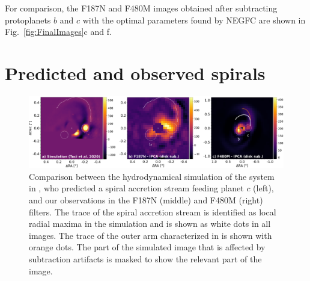 \documentclass[longauth]{aa}
\newcommand{\vc}[1]{#1}
\begin{document}
\begin{appendix}
For comparison, the F187N and F480M images obtained after subtracting protoplanets $b$ and $c$ with the optimal parameters found by NEGFC are shown in Fig.~\ref{fig:FinalImages}c and f.



\section{Predicted and observed spirals}

    \begin{figure}
    \centering
    \includegraphics[width=\textwidth]{FigC_v2.pdf}
    \caption{Comparison between the hydrodynamical simulation of the system in \citet{Toci2020}, who predicted a spiral accretion stream feeding planet $c$ (left), and our observations in the F187N (middle) and F480M (right) filters. The trace of the spiral accretion stream is identified as local radial maxima in the simulation and is shown as white dots in all images. The trace of the outer arm characterized in \citet{Juillard2022} is shown with orange dots. The part of the simulated image that is affected by subtraction artifacts is masked to show the relevant part of the image. %
    }
    \label{fig:SpiralTrace}
    \end{figure}



\end{appendix}
\end{document}
